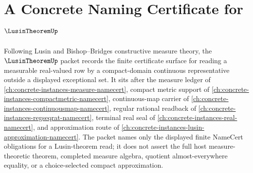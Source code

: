 \chapter{A Concrete Naming Certificate for $\LusinTheoremUp$}
\label{ch:concrete-instances-lusin-theorem-namecert}

Following Lusin and Bishop--Bridges constructive measure theory, the $\LusinTheoremUp$ packet records the finite certificate surface for reading a measurable real-valued row by a compact-domain continuous representative outside a displayed exceptional set. It sits after the measure ledger of \autoref{ch:concrete-instances-measure-namecert}, compact metric support of \autoref{ch:concrete-instances-compactmetric-namecert}, continuous-map carrier of \autoref{ch:concrete-instances-continuousmap-namecert}, regular rational readback of \autoref{ch:concrete-instances-regseqrat-namecert}, terminal real seal of \autoref{ch:concrete-instances-real-namecert}, and approximation route of \autoref{ch:concrete-instances-lusin-approximation-namecert}. The packet names only the displayed finite NameCert obligations for a Lusin-theorem read; it does not assert the full host measure-theoretic theorem, completed measure algebra, quotient almost-everywhere equality, or a choice-selected compact approximation.


